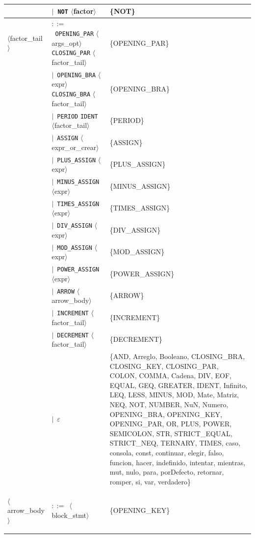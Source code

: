 \documentclass[10pt]{article}
\begin{document}
{\begin{longtable}{@{} p{2.0cm} p{6.9cm} p{6.9cm} @{}}
   & $\mid$~\texttt{NOT} $\langle$factor$\rangle$ & \{NOT\} \\
  \midrule
  \textcolor{ntcolor}{\parbox[t]{1.8cm}{\raggedright$\langle$factor\_\allowbreak{}tail$\rangle$}} & $::=$~\texttt{OPENING\_PAR} $\langle$args\_opt$\rangle$ \texttt{CLOSING\_PAR} $\langle$factor\_tail$\rangle$ & \{OPENING\_PAR\} \\
   & $\mid$~\texttt{OPENING\_BRA} $\langle$expr$\rangle$ \texttt{CLOSING\_BRA} $\langle$factor\_tail$\rangle$ & \{OPENING\_BRA\} \\
   & $\mid$~\texttt{PERIOD} \texttt{IDENT} $\langle$factor\_tail$\rangle$ & \{PERIOD\} \\
   & $\mid$~\texttt{ASSIGN} $\langle$expr\_or\_crear$\rangle$ & \{ASSIGN\} \\
   & $\mid$~\texttt{PLUS\_ASSIGN} $\langle$expr$\rangle$ & \{PLUS\_ASSIGN\} \\
   & $\mid$~\texttt{MINUS\_ASSIGN} $\langle$expr$\rangle$ & \{MINUS\_ASSIGN\} \\
   & $\mid$~\texttt{TIMES\_ASSIGN} $\langle$expr$\rangle$ & \{TIMES\_ASSIGN\} \\
   & $\mid$~\texttt{DIV\_ASSIGN} $\langle$expr$\rangle$ & \{DIV\_ASSIGN\} \\
   & $\mid$~\texttt{MOD\_ASSIGN} $\langle$expr$\rangle$ & \{MOD\_ASSIGN\} \\
   & $\mid$~\texttt{POWER\_ASSIGN} $\langle$expr$\rangle$ & \{POWER\_ASSIGN\} \\
   & $\mid$~\texttt{ARROW} $\langle$arrow\_body$\rangle$ & \{ARROW\} \\
   & $\mid$~\texttt{INCREMENT} $\langle$factor\_tail$\rangle$ & \{INCREMENT\} \\
   & $\mid$~\texttt{DECREMENT} $\langle$factor\_tail$\rangle$ & \{DECREMENT\} \\
   & $\mid$~$\varepsilon$ & \{AND, Arreglo, Booleano, CLOSING\_BRA, CLOSING\_KEY, CLOSING\_PAR, COLON, COMMA, Cadena, DIV, EOF, EQUAL, GEQ, GREATER, IDENT, Infinito, LEQ, LESS, MINUS, MOD, Mate, Matriz, NEQ, NOT, NUMBER, NuN, Numero, OPENING\_BRA, OPENING\_KEY, OPENING\_PAR, OR, PLUS, POWER, SEMICOLON, STR, STRICT\_EQUAL, STRICT\_NEQ, TERNARY, TIMES, caso, consola, const, continuar, elegir, falso, funcion, hacer, indefinido, intentar, mientras, mut, nulo, para, porDefecto, retornar, romper, si, var, verdadero\} \\
  \midrule
  \textcolor{ntcolor}{\parbox[t]{1.8cm}{\raggedright$\langle$arrow\_\allowbreak{}body$\rangle$}} & $::=$~$\langle$block\_stmt$\rangle$ & \{OPENING\_KEY\} \\

\end{longtable}}
\end{document}
